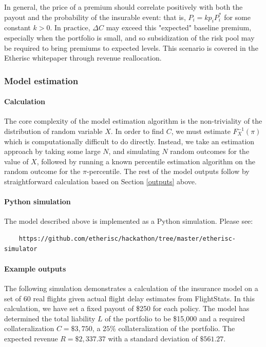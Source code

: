 \documentclass[12pt,a4paper]{article}
\begin{document}
In general, the price of a premium should correlate positively with both the payout and the probability of the insurable event: that is, $P_i = kp_iP_i^*$ for some constant $k>0$. In practice, $\Delta C$ may exceed this "expected" baseline premium, especially when the portfolio is small, and so subsidization of the risk pool may be required to bring premiums to expected levels. This scenario is covered in the Etherisc whitepaper through revenue reallocation.

\subsubsection{Model estimation}

\paragraph{Calculation}

The core complexity of the model estimation algorithm is the non-triviality of the distribution of random variable $X$. In order to find $C$, we must estimate $F_X^{-1}(\pi)$ which is computationally difficult to do directly. Instead, we take an estimation approach by taking some large $N$, and simulating $N$ random outcomes for the value of $X$, followed by running a known percentile estimation algorithm on the random outcome for the $\pi$-percentile. The rest of the model outputs follow by straightforward calculation based on Section \ref{outputs} above.

\paragraph{Python simulation}

The model described above is implemented as a Python simulation. Please see:
\begin{verbatim}
    https://github.com/etherisc/hackathon/tree/master/etherisc-simulator
\end{verbatim}

\paragraph{Example outputs}

The following simulation demonstrates a calculation of the insurance model on a set of 60 real flights given actual flight delay estimates from FlightStats. In this calculation, we have set a fixed payout of \$250 for each policy. The model has determined the total liability $L$ of the portfolio to be \$15,000 and a required collateralization $C=\$3,750$, a $25\%$ collateralization of the portfolio. The expected revenue $R=\$2,337.37$ with a standard deviation of $\$561.27$.
\end{document}

